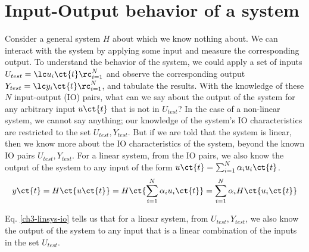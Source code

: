 \section{Input-Output behavior of a system}

Consider a general system $H$ about which we know nothing about. We can interact with the system by applying some input and measure the corresponding output. To understand the behavior of the system, we could apply a set of inputs $U_{test} = \lc u_i \ct{t}\rc_{i=1}^N$ and observe the corresponding output $Y_{test} = \lc y_i \ct{t}\rc_{i=1}^N$, and tabulate the results. With the knowledge of these $N$ input-output (IO) pairs, what can we say about the output of the system for any arbitrary input $u\ct{t}$ that is not in $U_{test}$? In the case of a non-linear system, we cannot say anything; our knowledge of the system's IO characteristics are restricted to the set $U_{test}, Y_{test}$. But if we are told that the system is linear, then we know more about the IO characteristics of the system, beyond the known IO pairs $U_{test}, Y_{test}$. For a linear system, from the IO pairs, we also know the output of the system to any input of the form $u\ct{t} = \sum_{i=1}^N \alpha_iu_i\ct{t}$.
\[ y\ct{t} = H\ct{u\ct{t}} = H\ct{\sum_{i=1}^N\alpha_i u_i\ct{t}} = \sum_{i=1}^N \alpha_iH\ct{u_i\ct{t}} \]

Eq. \ref{ch3-linsys-io} tells us that for a linear system, from $U_{test}, Y_{test}$, we also know the output of the system to any input that is a linear combination of the inputs in the set $U_{test}$.



